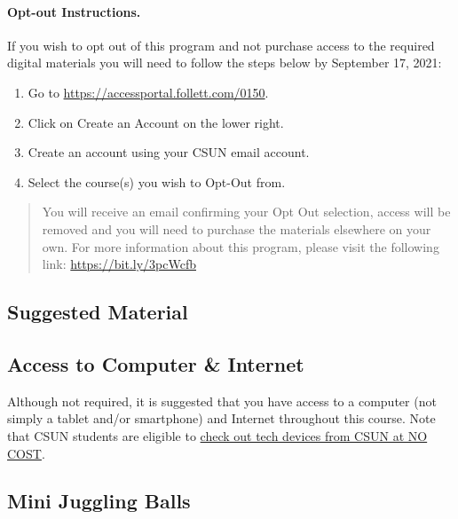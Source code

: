 \documentclass[11pt,]{article}
\providecommand{\tightlist}{%
  \setlength{\itemsep}{0pt}\setlength{\parskip}{0pt}}
\begin{document}
\hypertarget{opt-out-instructions.}{%
\paragraph{Opt-out Instructions.}\label{opt-out-instructions.}}

If you wish to opt out of this program and not purchase access to the
required digital materials you will need to follow the steps below by
September 17, 2021:

\begin{enumerate}
\def\labelenumi{\arabic{enumi}.}
\tightlist
\item
  Go to \url{https://accessportal.follett.com/0150}.
\item
  Click on Create an Account on the lower right.
\item
  Create an account using your CSUN email account.
\item
  Select the course(s) you wish to Opt-Out from.
\end{enumerate}

\begin{quote}
You will receive an email confirming your Opt Out selection, access will
be removed and you will need to purchase the materials elsewhere on your
own. For more information about this program, please visit the following
link: \url{https://bit.ly/3pcWcfb}
\end{quote}

\hypertarget{suggested-material}{%
\subsection{Suggested Material}\label{suggested-material}}

\hypertarget{access-to-computer-internet}{%
\subsection{Access to Computer \&
Internet}\label{access-to-computer-internet}}

Although not required, it is suggested that you have access to a
computer (not simply a tablet and/or smartphone) and Internet throughout
this course. Note that CSUN students are eligible to
\href{https://www.csun.edu/it/device-loaner-program}{check out tech
devices from CSUN at NO COST}.

\hypertarget{mini-juggling-balls}{%
\subsection{Mini Juggling Balls}\label{mini-juggling-balls}}
\end{document}
